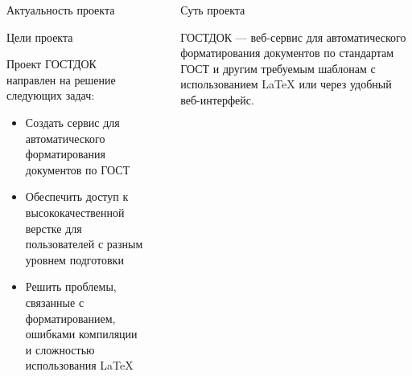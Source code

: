 \documentclass[final]{beamer}
\newlength{\sepwid}
\newlength{\onecolwid}
\newlength{\twocolwid}
\begin{document}
\begin{frame}[t]
\begin{columns}[t]
\begin{column}{\onecolwid}
\begin{block}{Актуальность проекта}
\end{block}


\begin{alertblock}{Цели проекта}

Проект ГОСТДОК направлен на решение следующих задач:
\begin{itemize}
\item Создать сервис для автоматического форматирования документов по ГОСТ
\item Обеспечить доступ к высококачественной верстке для пользователей с разным уровнем подготовки
\item Решить проблемы, связанные с форматированием, ошибками компиляции и сложностью использования LaTeX
\end{itemize}

\end{alertblock}


\end{column} %

\begin{column}{\sepwid}\end{column} %

\begin{column}{\twocolwid} %

\begin{columns}[t,totalwidth=\twocolwid] %

\begin{column}{\onecolwid}\vspace{-.6in} %


\begin{block}{Суть проекта}

ГОСТДОК — веб-сервис для автоматического форматирования документов по стандартам ГОСТ и другим требуемым шаблонам с использованием LaTeX или через удобный веб-интерфейс.


\end{block}
\end{column}
\end{columns}
\end{column}
\end{columns}
\end{frame}
\end{document}
